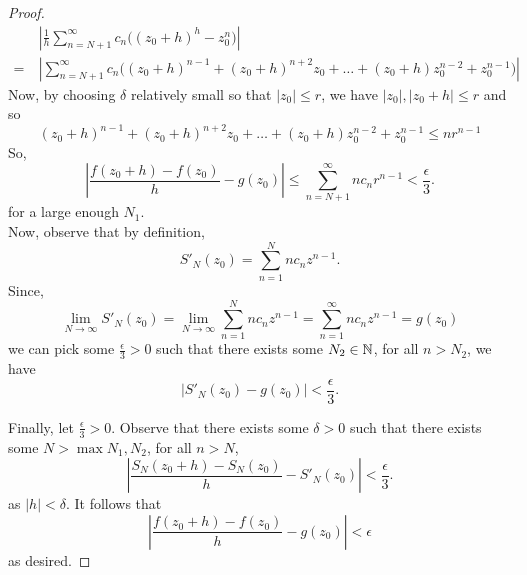 \documentclass[11pt]{article}
\begin{document}
\begin{proof}
\begin{align*}
&\>\left|\frac{1}{h} \sum^\infty_{n=N+1}c_n \big((z_0+h)^h -z_0^n\big)\right|\\
=&\> \left|\sum^{\infty}_{n=N+1}c_n\big((z_0+h)^{n-1} + (z_0+h)^{n+2}z_0 + \dots +
(z_0+h)z_0^{n-2} + z_0^{n-1}\big)\right|
\end{align*}
Now, by choosing $\delta$ relatively small so that $|z_0|\leq r $, we have
$|z_0|, |z_0+h| \leq r$ and so
\begin{equation*}
(z_0+h)^{n-1} + (z_0+h)^{n+2}z_0 + \dots + (z_0+h)z_0^{n-2} + z_0^{n-1} \leq nr^{n-1}
\end{equation*}
So,
\begin{equation*}
\left|\frac{f(z_0+h) - f(z_0)}{h} - g(z_0)\right| \leq
\sum^\infty_{n=N+1}nc_nr^{n-1} < \frac{\epsilon}{3}.
\end{equation*}
for a large enough $N_1$.\\

Now, observe that by definition,
\begin{equation*}
S'_N(z_0) = \sum^N_{n=1} nc_nz^{n-1}.
\end{equation*}
Since,
\begin{equation*}
\lim_{N\to\infty} S'_N(z_0)
= \lim_{N\to\infty} \sum^N_{n=1} nc_nz^{n-1}
= \sum^\infty_{n=1} nc_nz^{n-1}
= g(z_0)
\end{equation*}
we can pick some $\frac{\epsilon}{3} >0$ such that there exists some $N_2\in\mathbb{N}$,
for all $n > N_2$, we have
\begin{equation*}
|S'_N(z_0) - g(z_0)| < \frac{\epsilon}{3}.
\end{equation*}

Finally, let $\frac{\epsilon}{3} > 0$. Observe that there exists some $\delta >
0$ such that there exists some $N > \max{N_1,N_2}$, for all $n > N$,
\begin{equation*}
\left|\frac{S_N(z_0+h) - S_N(z_0)}{h} - S'_N(z_0)\right| <
\frac{\epsilon}{3}.
\end{equation*}
as $|h| < \delta$. It follows that
\begin{equation*}
\left|\frac{f(z_0+h) - f(z_0)}{h} - g(z_0)\right| < \epsilon
\end{equation*}
as desired.
\end{proof}
\end{document}
